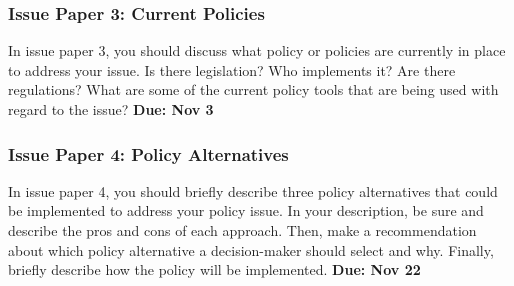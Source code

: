 \hypertarget{issue-paper-3-current-policies}{%
\subsubsection{Issue Paper 3: Current
Policies}\label{issue-paper-3-current-policies}}

In issue paper 3, you should discuss what policy or policies are
currently in place to address your issue. Is there legislation? Who
implements it? Are there regulations? What are some of the current
policy tools that are being used with regard to the issue? \textbf{Due:
Nov 3}

\hypertarget{issue-paper-4-policy-alternatives}{%
\subsubsection{Issue Paper 4: Policy
Alternatives}\label{issue-paper-4-policy-alternatives}}

In issue paper 4, you should briefly describe three policy alternatives
that could be implemented to address your policy issue. In your
description, be sure and describe the pros and cons of each approach.
Then, make a recommendation about which policy alternative a
decision-maker should select and why. Finally, briefly describe how the
policy will be implemented. \textbf{Due: Nov 22}
